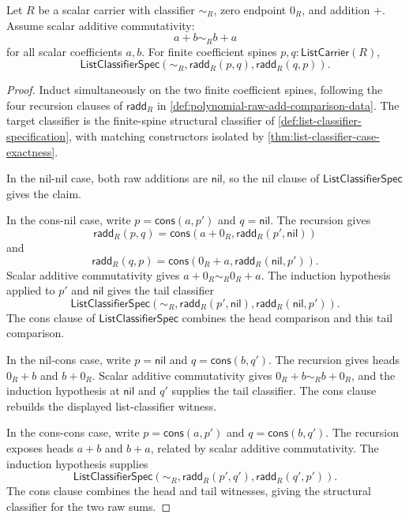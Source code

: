 \begin{lemma}
\label{lem:polynomial-raw-add-structural-swap}
Let $R$ be a scalar carrier with classifier $\sim_R$, zero endpoint $0_R$, and addition $+$. Assume scalar additive commutativity:
$$
a+b\sim_R b+a
$$
for all scalar coefficients $a,b$. For finite coefficient spines $p,q:\mathsf{ListCarrier}(R)$,
$$
\mathsf{ListClassifierSpec}(\sim_R,\mathsf{radd}_R(p,q),\mathsf{radd}_R(q,p)).
$$
\end{lemma}
\begin{proof}
Induct simultaneously on the two finite coefficient spines, following the four recursion clauses of $\mathsf{radd}_R$ in \autoref{def:polynomial-raw-add-comparison-data}. The target classifier is the finite-spine structural classifier of \autoref{def:list-classifier-specification}, with matching constructors isolated by \autoref{thm:list-classifier-case-exactness}.

In the nil-nil case, both raw additions are $\mathsf{nil}$, so the nil clause of $\mathsf{ListClassifierSpec}$ gives the claim.

In the cons-nil case, write $p=\mathsf{cons}(a,p')$ and $q=\mathsf{nil}$. The recursion gives
$$
\mathsf{radd}_R(p,q)=\mathsf{cons}(a+0_R,\mathsf{radd}_R(p',\mathsf{nil}))
$$
and
$$
\mathsf{radd}_R(q,p)=\mathsf{cons}(0_R+a,\mathsf{radd}_R(\mathsf{nil},p')).
$$
Scalar additive commutativity gives $a+0_R\sim_R0_R+a$. The induction hypothesis applied to $p'$ and $\mathsf{nil}$ gives the tail classifier
$$
\mathsf{ListClassifierSpec}(\sim_R,\mathsf{radd}_R(p',\mathsf{nil}),\mathsf{radd}_R(\mathsf{nil},p')).
$$
The cons clause of $\mathsf{ListClassifierSpec}$ combines the head comparison and this tail comparison.

In the nil-cons case, write $p=\mathsf{nil}$ and $q=\mathsf{cons}(b,q')$. The recursion gives heads $0_R+b$ and $b+0_R$. Scalar additive commutativity gives $0_R+b\sim_Rb+0_R$, and the induction hypothesis at $\mathsf{nil}$ and $q'$ supplies the tail classifier. The cons clause rebuilds the displayed list-classifier witness.

In the cons-cons case, write $p=\mathsf{cons}(a,p')$ and $q=\mathsf{cons}(b,q')$. The recursion exposes heads $a+b$ and $b+a$, related by scalar additive commutativity. The induction hypothesis supplies
$$
\mathsf{ListClassifierSpec}(\sim_R,\mathsf{radd}_R(p',q'),\mathsf{radd}_R(q',p')).
$$
The cons clause combines the head and tail witnesses, giving the structural classifier for the two raw sums.
\end{proof}

